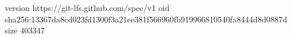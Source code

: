 version https://git-lfs.github.com/spec/v1
oid sha256:13367da8cd023fd1300f3a21ee381f566960fb919966810540fa8444d8d0887d
size 403347

